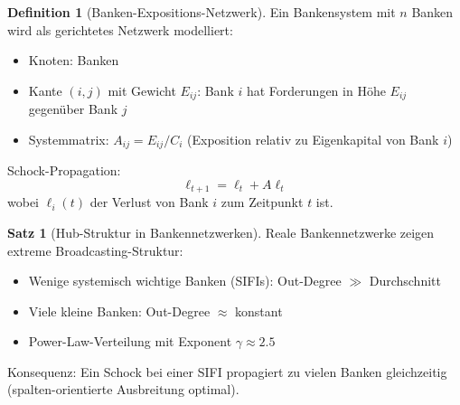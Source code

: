 \documentclass[a4paper,12pt]{report}
\theoremstyle{definition}
\newtheorem{definition}{Definition}
\newtheorem{satz}{Satz}
\begin{document}
	\begin{definition}[Banken-Expositions-Netzwerk]
		Ein Bankensystem mit $n$ Banken wird als gerichtetes Netzwerk modelliert:
		\begin{itemize}
			\item Knoten: Banken
			\item Kante $(i,j)$ mit Gewicht $E_{ij}$: Bank $i$ hat Forderungen in Höhe $E_{ij}$ gegenüber Bank $j$
			\item Systemmatrix: $A_{ij} = E_{ij} / C_i$ (Exposition relativ zu Eigenkapital von Bank $i$)
		\end{itemize}
		
		Schock-Propagation:
		\[
		\ell_{t+1} = \ell_t + A \ell_t
		\]
		wobei $\ell_i(t)$ der Verlust von Bank $i$ zum Zeitpunkt $t$ ist.
	\end{definition}
	
	\begin{satz}[Hub-Struktur in Bankennetzwerken]
		Reale Bankennetzwerke zeigen extreme Broadcasting-Struktur:
		\begin{itemize}
			\item Wenige systemisch wichtige Banken (SIFIs): Out-Degree $\gg$ Durchschnitt
			\item Viele kleine Banken: Out-Degree $\approx$ konstant
			\item Power-Law-Verteilung mit Exponent $\gamma \approx 2.5$
		\end{itemize}
		
		Konsequenz: Ein Schock bei einer SIFI propagiert zu vielen Banken gleichzeitig (spalten-orientierte Ausbreitung optimal).
	\end{satz}
	
\end{document}
